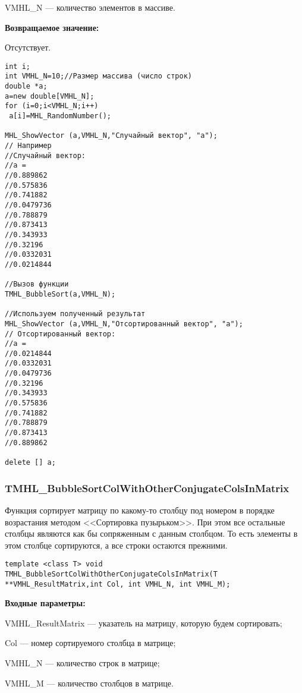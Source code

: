 \documentclass[a4paper,12pt]{article}
\begin{document}
VMHL\_N --- количество элементов в массиве.

\textbf{Возвращаемое значение:}

Отсутствует.


\begin{lstlisting}[label=code_use_TMHL_BubbleSort,caption=Пример использования]
int i;
int VMHL_N=10;//Размер массива (число строк)
double *a;
a=new double[VMHL_N];
for (i=0;i<VMHL_N;i++)
 a[i]=MHL_RandomNumber();

MHL_ShowVector (a,VMHL_N,"Случайный вектор", "a");
// Например
//Случайный вектор:
//a =
//0.889862
//0.575836
//0.741882
//0.0479736
//0.788879
//0.873413
//0.343933
//0.32196
//0.0332031
//0.0214844

//Вызов функции
TMHL_BubbleSort(a,VMHL_N);

//Используем полученный результат
MHL_ShowVector (a,VMHL_N,"Отсортированный вектор", "a");
// Отсортированный вектор:
//a =
//0.0214844
//0.0332031
//0.0479736
//0.32196
//0.343933
//0.575836
//0.741882
//0.788879
//0.873413
//0.889862

delete [] a;
\end{lstlisting}

\subsubsection{TMHL\_BubbleSortColWithOtherConjugateColsInMatrix}\label{TMHL_BubbleSortColWithOtherConjugateColsInMatrix}

Функция сортирует матрицу по какому-то столбцу под номером в порядке возрастания методом <<Сортировка пузырьком>>. При этом все остальные столбцы являются как бы сопряженным с данным столбцом. То есть элементы в этом столбце сортируются, а все строки остаются прежними.


\begin{lstlisting}[label=code_syntax_TMHL_BubbleSortColWithOtherConjugateColsInMatrix,caption=Синтаксис]
template <class T> void TMHL_BubbleSortColWithOtherConjugateColsInMatrix(T **VMHL_ResultMatrix,int Col, int VMHL_N, int VMHL_M);
\end{lstlisting}

\textbf{Входные параметры:}
 
VMHL\_ResultMatrix --- указатель на матрицу, которую будем сортировать;
 
Col --- номер сортируемого столбца в матрице;
 
VMHL\_N --- количество строк в матрице;
 
VMHL\_M --- количество столбцов в матрице.
\end{document}
